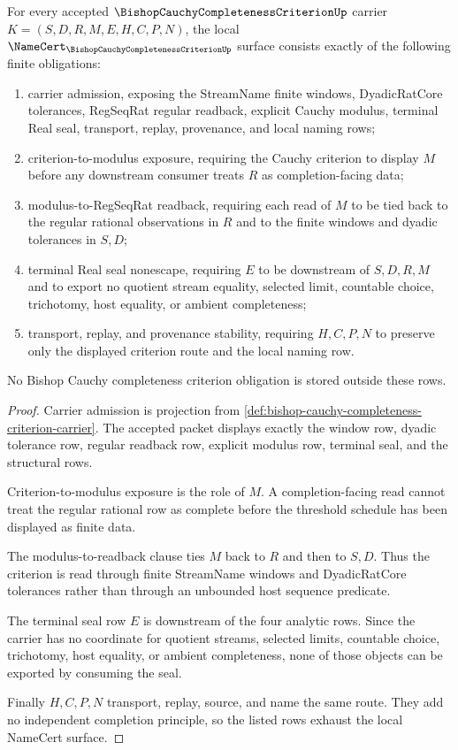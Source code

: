 \begin{theorem}
\label{thm:bishop-cauchy-completeness-criterion-obligations}
For every accepted $\BishopCauchyCompletenessCriterionUp$ carrier $K=(S,D,R,M,E,H,C,P,N)$, the local $\NameCert_{\BishopCauchyCompletenessCriterionUp}$ surface consists exactly of the following finite obligations:
\begin{enumerate}
\item carrier admission, exposing the StreamName finite windows, DyadicRatCore tolerances, RegSeqRat regular readback, explicit Cauchy modulus, terminal Real seal, transport, replay, provenance, and local naming rows;
\item criterion-to-modulus exposure, requiring the Cauchy criterion to display $M$ before any downstream consumer treats $R$ as completion-facing data;
\item modulus-to-RegSeqRat readback, requiring each read of $M$ to be tied back to the regular rational observations in $R$ and to the finite windows and dyadic tolerances in $S,D$;
\item terminal Real seal nonescape, requiring $E$ to be downstream of $S,D,R,M$ and to export no quotient stream equality, selected limit, countable choice, trichotomy, host equality, or ambient completeness;
\item transport, replay, and provenance stability, requiring $H,C,P,N$ to preserve only the displayed criterion route and the local naming row.
\end{enumerate}
No Bishop Cauchy completeness criterion obligation is stored outside these rows.
\end{theorem}
\begin{proof}
Carrier admission is projection from \autoref{def:bishop-cauchy-completeness-criterion-carrier}. The accepted packet displays exactly the window row, dyadic tolerance row, regular readback row, explicit modulus row, terminal seal, and the structural rows.

Criterion-to-modulus exposure is the role of $M$. A completion-facing read cannot treat the regular rational row as complete before the threshold schedule has been displayed as finite data.

The modulus-to-readback clause ties $M$ back to $R$ and then to $S,D$. Thus the criterion is read through finite StreamName windows and DyadicRatCore tolerances rather than through an unbounded host sequence predicate.

The terminal seal row $E$ is downstream of the four analytic rows. Since the carrier has no coordinate for quotient streams, selected limits, countable choice, trichotomy, host equality, or ambient completeness, none of those objects can be exported by consuming the seal.

Finally $H,C,P,N$ transport, replay, source, and name the same route. They add no independent completion principle, so the listed rows exhaust the local NameCert surface.
\end{proof}

